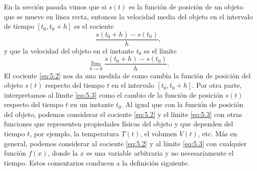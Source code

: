 \documentclass[12pt,a4paper]{book}
\begin{document}
    En la sección pasada vimos que si $s(t)$ es la función de posición de un
    objeto que se mueve en línea recta, entonces la velocidad media del objeto
    en el intervalo de tiempo $[t_{0},t_{0}+h]$ es el cociente
    \begin{equation}\label{eq:5.2}
        \frac{s(t_{0}+h)-s(t_{0})}{h},
    \end{equation}
    y que la velocidad del objeto en el instante $t_{0}$ es el límite
    \begin{equation}\label{eq:5.3}
        \lim_{h\to 0}\frac{s(t_{0}+h)-s(t_{0})}{h}.
    \end{equation}
    El cociente \eqref{eq:5.2} nos da una medida de como cambia la función de posición
    del objeto $s(t)$ respecto del tiempo $t$ en el intervalo $[t_{0},t_{0}+h]$. Por otra
    parte, interpretamos al límite \eqref{eq:5.3} como el cambio de la función de posición
    $s(t)$ respecto del tiempo $t$ en un instante $t_{0}$. Al igual que con la función de
    posición del objeto, podemos considerar el cociente \eqref{eq:5.2} y el límite \eqref{eq:5.3} con
    otras funciones que representen propiedades físicas del objeto y que dependen
    del tiempo $t$, por ejemplo, la temperatura $T(t)$, el volumen $V(t)$, etc. Más en
    general, podemos considerar al cociente \eqref{eq:5.2} y al límite \eqref{eq:5.3} con cualquier
    función $f(x)$, donde la $x$ es una variable arbitraria y no necesariamente el
    tiempo. Estos comentarios conducen a la definición siguiente.
\end{document}
